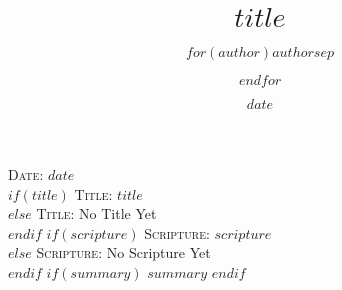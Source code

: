\documentclass[Letter, 12pt]{report}
\title{$title$}
\author{$for(author)$$author$$sep$ \and $endfor$}
\date{$date$}
\begin{document}
\textsc{Date}: $date$ \\
$if(title)$
\textsc{Title}: $title$ \\
$else$
\textsc{Title}: No Title Yet\\
$endif$ 
$if(scripture)$
\textsc{Scripture}: $scripture$ \\
$else$
\textsc{Scripture}: No Scripture Yet \\
$endif$
$if(summary)$
$summary$
$endif$
\end{document}
